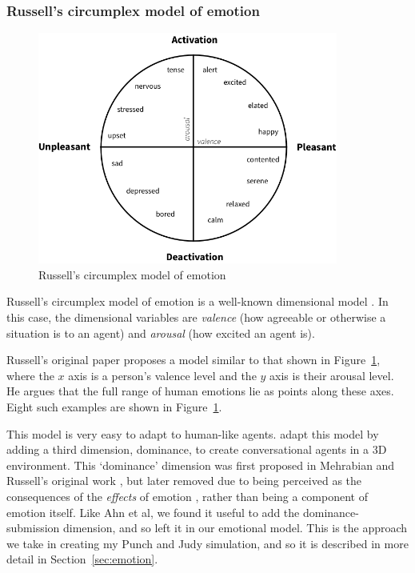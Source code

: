 \documentclass[11pt]{report}
\begin{document}
\subsubsection{Russell's circumplex model of emotion}\label{sec:circumplex}
\begin{figure}[!t]
\centerline{\includegraphics[height=3in]{circumplex.png}}
\caption{Russell's circumplex model of emotion} \label{fig:circumplex}
\end{figure}

Russell's circumplex model of emotion is a well-known dimensional model \citep{russell1980circumplex}. In this case, the dimensional variables are \emph{valence} (how agreeable or otherwise a situation is to an agent) and \emph{arousal} (how excited an agent is).

Russell's original paper proposes a model similar to that shown in Figure~\ref{fig:circumplex}, where the $x$ axis is a person's valence level and the $y$ axis is their arousal level. He argues that the full range of human emotions lie as points along these axes. Eight such examples are shown in Figure~\ref{fig:circumplex}.

This model is very easy to adapt to human-like agents. \citet{ahn2012nvc} adapt
this model by adding a third dimension, dominance, to create conversational
agents in a 3D environment. This `dominance' dimension was first proposed in
Mehrabian and Russell's original work \citep{mehrabian1974approach}, but later
removed due to being perceived as the consequences of the \emph{effects\/} of
emotion \citep{russell1980circumplex}, rather than being a component of emotion
itself. Like Ahn et al, we found it useful to add the dominance-submission
dimension, and so left it in our emotional model. This is the approach we take in creating my Punch and Judy simulation, and so it is described in more detail in Section~\ref{sec:emotion}.
\end{document}
